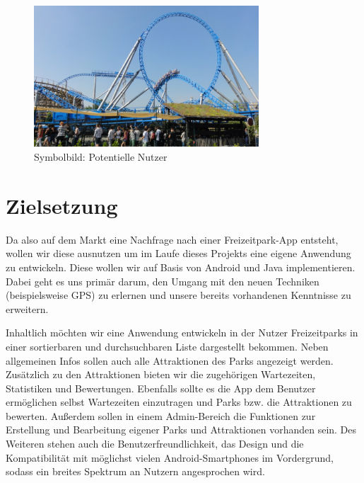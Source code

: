 \begin{figure}[htp]
	\centering
  	\includegraphics[width=0.75\textwidth]{img/motivation/bluefire.jpg}
	\caption[Blue Fire Achterbahn]{Symbolbild: Potentielle Nutzer\footnotemark}
	\label{figure:bluefire}
\end{figure}

\section{Zielsetzung}
\label{sec:einleitung:zielsetzung}

Da also auf dem Markt eine Nachfrage nach einer Freizeitpark-App entsteht, wollen wir diese ausnutzen um im Laufe dieses Projekts eine eigene Anwendung zu entwickeln. Diese wollen wir auf Basis von Android und Java implementieren. Dabei geht es uns primär darum, den Umgang mit den neuen Techniken (beispielsweise GPS) zu erlernen und unsere bereits vorhandenen Kenntnisse zu erweitern. 

Inhaltlich möchten wir eine Anwendung entwickeln in der Nutzer Freizeitparks in einer sortierbaren und durchsuchbaren Liste dargestellt bekommen. Neben allgemeinen Infos sollen auch alle Attraktionen des Parks angezeigt werden. Zusätzlich zu den Attraktionen bieten wir die zugehörigen Wartezeiten, Statistiken und Bewertungen. Ebenfalls sollte es die App dem Benutzer ermöglichen selbst Wartezeiten einzutragen und Parks bzw. die Attraktionen zu bewerten. Außerdem sollen in einem Admin-Bereich die Funktionen zur Erstellung und Bearbeitung eigener Parks und Attraktionen vorhanden sein. Des Weiteren stehen auch die Benutzerfreundlichkeit, das Design und die Kompatibilität mit möglichst vielen Android-Smartphones im Vordergrund, sodass ein breites Spektrum an Nutzern angesprochen wird. 

